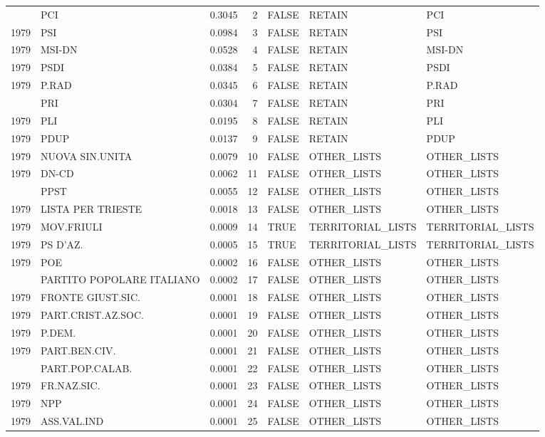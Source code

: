 \begin{longtable}[t]{rlrrlll}
\addlinespace
1979 & PCI & 0.3045 & 2 & FALSE & RETAIN & PCI\\
1979 & PSI & 0.0984 & 3 & FALSE & RETAIN & PSI\\
1979 & MSI-DN & 0.0528 & 4 & FALSE & RETAIN & MSI-DN\\
1979 & PSDI & 0.0384 & 5 & FALSE & RETAIN & PSDI\\
1979 & P.RAD & 0.0345 & 6 & FALSE & RETAIN & P.RAD\\
\addlinespace
1979 & PRI & 0.0304 & 7 & FALSE & RETAIN & PRI\\
1979 & PLI & 0.0195 & 8 & FALSE & RETAIN & PLI\\
1979 & PDUP & 0.0137 & 9 & FALSE & RETAIN & PDUP\\
1979 & NUOVA SIN.UNITA & 0.0079 & 10 & FALSE & OTHER\_LISTS & OTHER\_LISTS\\
1979 & DN-CD & 0.0062 & 11 & FALSE & OTHER\_LISTS & OTHER\_LISTS\\
\addlinespace
1979 & PPST & 0.0055 & 12 & FALSE & OTHER\_LISTS & OTHER\_LISTS\\
1979 & LISTA PER TRIESTE & 0.0018 & 13 & FALSE & OTHER\_LISTS & OTHER\_LISTS\\
1979 & MOV.FRIULI & 0.0009 & 14 & TRUE & TERRITORIAL\_LISTS & TERRITORIAL\_LISTS\\
1979 & PS D'AZ. & 0.0005 & 15 & TRUE & TERRITORIAL\_LISTS & TERRITORIAL\_LISTS\\
1979 & POE & 0.0002 & 16 & FALSE & OTHER\_LISTS & OTHER\_LISTS\\
\addlinespace
1979 & PARTITO POPOLARE ITALIANO & 0.0002 & 17 & FALSE & OTHER\_LISTS & OTHER\_LISTS\\
1979 & FRONTE GIUST.SIC. & 0.0001 & 18 & FALSE & OTHER\_LISTS & OTHER\_LISTS\\
1979 & PART.CRIST.AZ.SOC. & 0.0001 & 19 & FALSE & OTHER\_LISTS & OTHER\_LISTS\\
1979 & P.DEM. & 0.0001 & 20 & FALSE & OTHER\_LISTS & OTHER\_LISTS\\
1979 & PART.BEN.CIV. & 0.0001 & 21 & FALSE & OTHER\_LISTS & OTHER\_LISTS\\
\addlinespace
1979 & PART.POP.CALAB. & 0.0001 & 22 & FALSE & OTHER\_LISTS & OTHER\_LISTS\\
1979 & FR.NAZ.SIC. & 0.0001 & 23 & FALSE & OTHER\_LISTS & OTHER\_LISTS\\
1979 & NPP & 0.0001 & 24 & FALSE & OTHER\_LISTS & OTHER\_LISTS\\
1979 & ASS.VAL.IND & 0.0001 & 25 & FALSE & OTHER\_LISTS & OTHER\_LISTS\\

\end{longtable}

